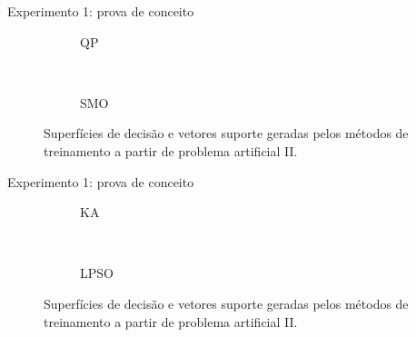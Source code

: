 \documentclass{beamer}
\begin{document}
\begin{frame}[noframenumbering]{Experimento 1: prova de conceito}
\begin{figure}[H]
    \begin{center}  
      \begin{subfigure}[b]{.40\textwidth}
        \caption{QP}
      \end{subfigure}
      ~
      \begin{subfigure}[b]{.40\textwidth}
        \caption{SMO}
      \end{subfigure}
      
    \end{center}
    \caption{Superfícies de decisão e vetores suporte geradas pelos métodos de treinamento a partir de problema artificial II.}\label{fig:simulacoes-pa-i-resultados}
\end{figure}
\end{frame}

\begin{frame}[noframenumbering]{Experimento 1: prova de conceito}
\begin{figure}[H]
    \begin{center}  
      \begin{subfigure}[b]{.40\textwidth}
        \caption{KA}
      \end{subfigure}
      ~
      \begin{subfigure}[b]{.40\textwidth}
        \caption{LPSO}
      \end{subfigure}
      
    \end{center}
    \caption{Superfícies de decisão e vetores suporte geradas pelos métodos de treinamento a partir de problema artificial II.}\label{fig:simulacoes-pa-i-resultados}
\end{figure}
\end{frame}
\end{document}
